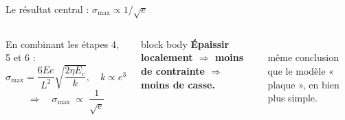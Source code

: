 \documentclass[11pt,aspectratio=169]{beamer}
\begin{document}
\begin{frame}{Le résultat central : $\boxed{\sigma_{\max}\propto 1/\sqrt{e}}$}
  \begin{columns}[c]
    En combinant les étapes 4, 5 et 6 :
    \[ \sigma_{\max}=\frac{6Ee}{L^2}\sqrt{\frac{2\eta E_c}{k}},
       \quad k\propto e^{3} \]
    \[ \Rightarrow\quad \sigma_{\max}\;\propto\;\frac{1}{\sqrt{e}} \]
    \vspace{0.2cm}
    \begin{beamercolorbox}[sep=6pt,rounded=true]{block body}
    \centering\textbf{Épaissir localement $\Rightarrow$ moins de contrainte
    $\Rightarrow$ moins de casse.}
    \end{beamercolorbox}
    \centering
    \\[2pt]\footnotesize même conclusion que le modèle « plaque », en bien plus simple.
  \end{columns}
\end{frame}
\end{document}
